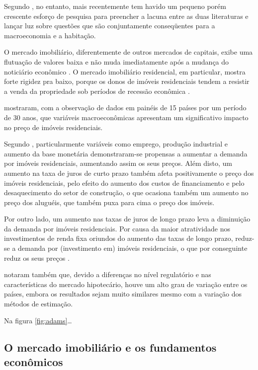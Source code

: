 \documentclass[
	12pt,				%
	oneside,			%
	a4paper,			%
	chapter=TITLE,		%
	section=TITLE,		%
	english,			%
	brazil				%
	]{abntex2}
\begin{document}
Segundo \textcite[p.~4]{LEUNG}, no entanto, mais recentemente tem havido um pequeno porém
crescente esforço de pesquisa para preencher a lacuna entre as duas literaturas
e lançar luz sobre questões que são conjuntamente conseqüentes para a
macroeconomia e a habitação.

O mercado imobiliário, diferentemente de outros mercados de capitais, exibe uma
flutuação de valores baixa e não muda imediatamente após a mudança do noticiário
econômico \autocite[3]{ADAMS201038}. O mercado imobiliário residencial, em particular,
mostra forte rigidez pra baixo, porque os donos de imóveis residenciais tendem
a resistir a venda da propriedade sob períodos de recessão econômica \autocite[129]{Case2000}.

\textcite{ADAMS201038} mostraram, com a observação de dados em painéis de 15 países por um
período de 30 anos, que variáveis macroeconômicas apresentam um significativo
impacto no preço de imóveis residenciais.

Segundo \textcite[p.~18]{ADAMS201038}, particularmente variáveis como
emprego, produção industrial e aumento da base monetária demonstraram-se
propensas a aumentar a demanda por imóveis residenciais, aumentando assim os
seus preços. Além disto, um aumento na taxa de juros de curto prazo também
afeta positivamente o preço dos imóveis residenciais, pelo efeito do aumento dos
custos de financiamento e pelo desaquecimento do setor de construção, o que
ocasiona também um aumento no preço dos aluguéis, que também puxa para cima
o preço dos imóveis.

Por outro lado, um aumento nas taxas de juros de longo prazo leva a diminuição
da demanda por imóveis residenciais. Por causa da maior atratividade nos
investimentos de renda fixa oriundos do aumento das taxas de longo prazo,
reduz-se a demanda por (investimento em) imóveis residenciais, o que
por conseguinte reduz os seus preços \autocite[19]{ADAMS201038}.

\textcite{ADAMS201038} notaram também que, devido a diferenças no nível regulatório e nas
características do mercado hipotecário, houve um alto grau de variação entre os
países, embora os resultados sejam muito similares mesmo com a variação dos
métodos de estimação.

Na figura \ref{fig:adams}\ldots{}

\hypertarget{o-mercado-imobiliuxe1rio-e-os-fundamentos-econuxf4micos}{%
\subsection{O mercado imobiliário e os fundamentos econômicos}\label{o-mercado-imobiliuxe1rio-e-os-fundamentos-econuxf4micos}}
\end{document}
